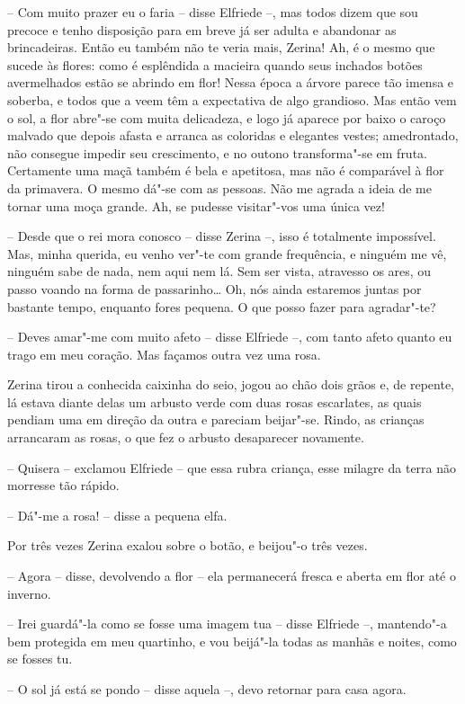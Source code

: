-- Com muito prazer eu o faria -- disse Elfriede --, mas todos dizem
que sou precoce e tenho disposição para em breve já ser adulta e
abandonar as brincadeiras. Então eu também não te veria mais, Zerina!
Ah, é o mesmo que sucede às flores: como é esplêndida a macieira quando
seus inchados botões avermelhados estão se abrindo em flor! Nessa época
a árvore parece tão imensa e soberba, e todos que a veem têm a
expectativa de algo grandioso. Mas então vem o sol, a flor abre"-se com
muita delicadeza, e logo já aparece por baixo o caroço malvado que
depois afasta e arranca as coloridas e elegantes vestes; amedrontado,
não consegue impedir seu crescimento, e no outono transforma"-se em
fruta. Certamente uma maçã também é bela e apetitosa, mas não é
comparável à flor da primavera. O mesmo dá"-se com as pessoas. Não me
agrada a ideia de me tornar uma moça grande. Ah, se pudesse visitar"-vos
uma única vez!

-- Desde que o rei mora conosco -- disse Zerina --, isso é totalmente
impossível. Mas, minha querida, eu venho ver"-te com grande frequência,
e ninguém me vê, ninguém sabe de nada, nem aqui nem lá. Sem ser vista,
atravesso os ares, ou passo voando na forma de passarinho\ldots{} Oh, nós
ainda estaremos juntas por bastante tempo, enquanto fores pequena. O
que posso fazer para agradar"-te?

-- Deves amar"-me com muito afeto -- disse Elfriede --, com tanto afeto
quanto eu trago em meu coração. Mas façamos outra vez uma rosa.

Zerina tirou a conhecida caixinha do seio, jogou ao chão dois grãos e,
de repente, lá estava diante delas um arbusto verde com duas rosas
escarlates, as quais pendiam uma em direção da outra e pareciam
beijar"-se. Rindo, as crianças arrancaram as rosas, o que fez o arbusto
desaparecer novamente.

-- Quisera -- exclamou Elfriede -- que essa rubra criança, esse milagre
da terra não morresse tão rápido.

-- Dá"-me a rosa! -- disse a pequena elfa. 

Por três vezes Zerina exalou sobre o botão, e beijou"-o três vezes.

-- Agora -- disse, devolvendo a flor -- ela permanecerá fresca e aberta
em flor até o inverno.

-- Irei guardá"-la como se fosse uma imagem tua -- disse Elfriede --,
mantendo"-a bem protegida em meu quartinho, e vou beijá"-la todas as
manhãs e noites, como se fosses tu.

-- O sol já está se pondo -- disse aquela --, devo retornar para casa agora.

